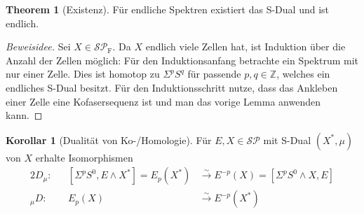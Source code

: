\documentclass[ngerman, parskip=half]{scrartcl}
\theoremstyle{definition}
\newtheorem*{Thm}{Theorem}
\newtheorem*{Kor}{Korollar}
\newcommand*{\SP}{\ensuremath{\mathcal{SP}}}
\newcommand*{\SPf}{\ensuremath{\SP_{\mathrm{F}}}}
\newcommand*{\Smash}{\ensuremath{\wedge}}
\newcommand*{\SDual}{S-Dual}
\newcommand*{\dual}[1]{\ensuremath{#1^*}}
\newcommand*{\Dd}[1]{\ensuremath{D_{#1}}}
\newcommand*{\dD}[1]{\ensuremath{{}_{#1}D}}
\newcommand*{\Sph}{\ensuremath{S^0}}
\newcommand*{\Z}{\mathds{Z}}
\begin{document}
\begin{Thm}[Existenz]
  Für endliche Spektren existiert das \SDual{} und ist endlich.
  \begin{proof}[Beweisidee]
    Sei $X\in\SPf$. Da $X$ endlich viele Zellen hat, ist
    Induktion über die Anzahl der Zellen möglich:
    Für den Induktionsanfang betrachte ein Spektrum mit nur einer
    Zelle. Dies ist homotop zu $\Sigma^{p}S^q$ für passende
    $p,q\in\Z$, welches ein endliches \SDual{} besitzt.
    Für den Induktionsschritt nutze, dass das Ankleben einer Zelle
    eine Kofasersequenz ist und man das vorige Lemma anwenden kann.
  \end{proof}
\end{Thm}

\begin{Kor}[Dualität von Ko-/Homologie]
  Für $E, X\in\SP$ mit \SDual{} $(\dual{X},\mu)$ von $X$ erhalte
  Isomorphismen
  \begin{alignat*}{2}
    \Dd{\mu}\colon&&
    [\Sigma^{p}\Sph,E\Smash\dual{X}] = E_{p}(\dual{X})
    &\overset{\sim}{\longrightarrow}
      E^{-p}(X) = [\Sigma^{p}\Sph \Smash X, E]\\
    \dD{\mu}\colon&&
    E_{p}(X)
    &\overset{\sim}{\longrightarrow}
      E^{-p}(\dual{X})
  \end{alignat*}
\end{Kor}
\end{document}
